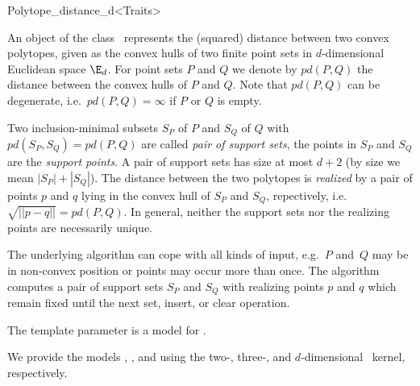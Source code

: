 
\begin{ccRefClass}{Polytope_distance_d<Traits>}


\ccSaveThreeColumns
\cgalPolytopeDistanceLayout

\newcommand{\PDempty}{%
  $pd(\emptyset, \emptyset)$}

\ccDefinition

An object of the class \ccRefName\ represents the (squared) distance
between two convex polytopes, given as the convex hulls of two finite point
sets in $d$-dimensional Euclidean space $\E_d$. For point sets $P$ and $Q$
we denote by $pd(P,Q)$ the distance between the convex hulls of $P$ and
$Q$. Note that $pd(P,Q)$ can be
degenerate,
i.e.~$pd(P,Q)=\infty$ if $P$ or $Q$ is empty.

Two inclusion-minimal subsets $S_P$ of $P$ and $S_Q$ of $Q$ with
$pd(S_P,S_Q)=pd(P,Q)$ are called \emph{pair of support
  sets}, the
points in $S_P$ and $S_Q$ are the \emph{support points}. A pair of support
sets has size at most $d+2$ (by size we mean $|S_P|+|S_Q|$). The distance
between the two polytopes is \emph{realized} by a pair of points $p$ and
$q$ lying in the convex hull of $S_P$ and $S_Q$, repectively,
i.e.~$\sqrt{||p-q||}=pd(P,Q)$. In general, neither the support sets nor the
realizing points are necessarily unique.

The underlying algorithm can cope with all kinds of input, e.g.~$P$ and~$Q$
may be in non-convex position or points may occur more than once. The
algorithm computes a pair of support sets $S_P$ and $S_Q$ with realizing
points $p$ and $q$ which remain fixed until the next set, insert, or clear
operation.


\ccRequirements
\ccIndexRequirements

The template parameter  is a model for .

We provide the models ,
, and  using the
two-, three-, and $d$-dimensional \cgal~kernel, respectively.


\end{ccRefClass}
